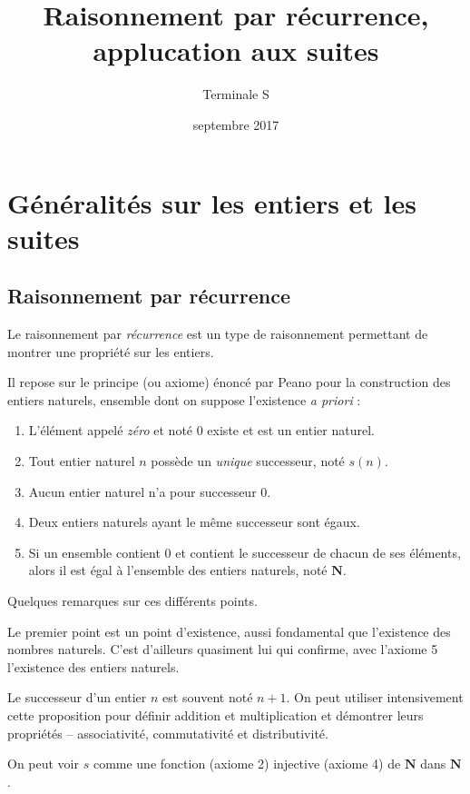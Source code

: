 \documentclass[12pt,a4paper]{article}
\title{Raisonnement par récurrence, applucation aux suites}
\author{Terminale S}
\date{septembre 2017}
\makeatletter
\renewcommand{\maketitle}%
{\framebox{%
    \begin{minipage}{1.0\linewidth}%
      \begin{center}%
        \Large \@title ~-- \@author \\%
        \@date%
      \end{center}%
    \end{minipage}}%
  \normalsize%
}
\newcommand{\N}{\mathbf{N}}
\theoremstyle{break}
\theoremstyle{plain}
\theoremstyle{nonumberplain}
\theoremstyle{nonumberbreak}
\makeatother
\begin{document}
\maketitle

\section{Généralités sur les entiers et les suites}

\subsection{Raisonnement par récurrence}

Le raisonnement par \emph{récurrence} est un type de raisonnement
permettant de montrer une propriété sur les entiers.

Il repose sur le principe (ou axiome) énoncé par Peano pour la
construction des entiers naturels, ensemble dont on suppose l'existence
\emph{a priori} :
\begin{enumerate}[label=(\roman*)]
  \item L'élément appelé \emph{zéro} et noté 0 existe et est un entier
    naturel.
  \item Tout entier naturel $n$ possède un \emph{unique} successeur,
    noté $s(n)$.
  \item Aucun entier naturel n'a pour successeur 0.
  \item Deux entiers naturels ayant le même successeur sont égaux.
  \item Si un ensemble contient 0 et contient le successeur de chacun de
    ses éléments, alors il est égal à l'ensemble des entiers naturels,
    noté $\N$.
\end{enumerate}

Quelques remarques sur ces différents points.

Le premier point est un point d'existence, aussi fondamental que
l'existence des nombres naturels. C'est d'ailleurs quasiment lui qui
confirme, avec l'axiome 5 l'existence des entiers naturels.

Le successeur d'un entier $n$ est souvent noté $n+1$. On peut utiliser
intensivement cette proposition pour définir addition et multiplication
et démontrer leurs propriétés -- associativité, commutativité et
distributivité.

On peut voir $s$ comme une fonction (axiome 2) injective (axiome 4) de
$\N$ dans $\N$.

\end{document}
